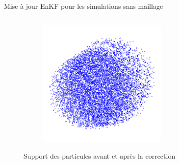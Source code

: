 \documentclass[aspectratio=169]{beamer} %
\begin{document}
\begin{frame}{Mise à jour EnKF pour les simulations sans maillage}
\begin{columns}[t]
\begin{column}{0.3\textwidth}
\begin{figure}
\begin{subfigure}{\textwidth}
                \end{subfigure}
                \begin{subfigure}{\textwidth}
                    \centering
                    \includegraphics[width=0.7\textwidth]{../../conference/images/all_particles.pdf}
                \end{subfigure}
                \caption*{Support des particules avant et après la correction}
            \end{figure}
        \end{column}
    \end{columns}
\end{frame}
\end{document}
